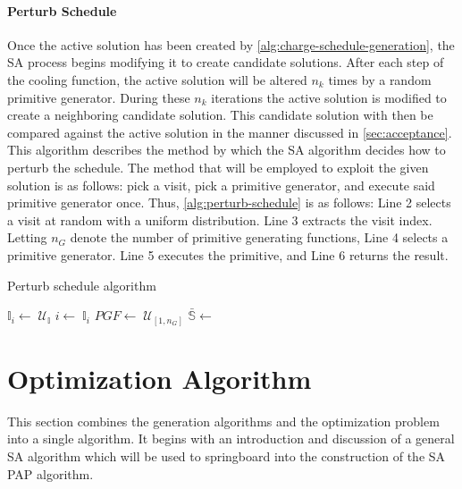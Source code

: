 \documentclass[11pt,a4paper,final]{article}
\newcommand{\I}{\mathbb{I}}                 %
\newcommand{\C}{\mathbb{C}}                 %
\newcommand{\U}{\mathcal{U}}                %
\newcommand{\Sol}{\mathbb{S}}               %
\begin{document}
\paragraph{Perturb Schedule}
\label{sec:tweak-schedule}
Once the active solution has been created by \ref{alg:charge-schedule-generation}, the SA process begins modifying it to
create candidate solutions. After each step of the cooling function, the active solution will be altered \(n_k\) times by
a random primitive generator. During these \(n_k\) iterations the active solution is modified to create a neighboring
candidate solution. This candidate solution with then be compared against the active solution in the manner discussed in
\ref{sec:acceptance}. This algorithm describes the method by which the SA algorithm decides how to perturb the schedule. The
method that will be employed to exploit the given solution is as follows: pick a visit, pick a primitive generator, and
execute said primitive generator once. Thus, \ref{alg:perturb-schedule} is as follows: Line 2 selects a visit at random
with a uniform distribution. Line 3 extracts the visit index. Letting \(n_G\) denote the number of primitive generating
functions, Line 4 selects a primitive generator. Line 5 executes the primitive, and Line 6 returns the result.

\begin{algorithm}[H]
\caption{Perturb schedule algorithm} \label{alg:perturb-schedule}

    \LinesNumbered
    \KwIn{$\I$, $\C$}
    \KwOut{$\bar{\I}$, $\bar{\C}$}


    \Begin
    {
        $\I_i\leftarrow\; \U_{\I}$
        $i \leftarrow\; \I_i$
        $PGF \leftarrow\; \U_{[1,n_G]}$
        $\bar{\Sol} \leftarrow$ \PGF{($i$, $\I$, $\C$)}
        \Return{($\_, \bar{\I}$, $\bar{\C}$)}
    }
\end{algorithm}
\section{Optimization Algorithm}
\label{sec:optimization-algorithm}
This section combines the generation algorithms and the optimization problem into a single algorithm. It begins with an
introduction and discussion of a general SA algorithm which will be used to springboard into the construction of the SA
PAP algorithm.
\end{document}
